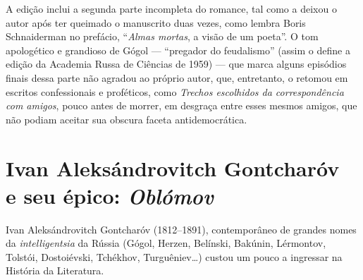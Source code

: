 A edição inclui a segunda parte incompleta do romance, tal como a deixou
o autor após ter queimado o manuscrito duas vezes, como lembra Boris Schnaiderman no prefácio, ``\emph{Almas mortas}, a visão de um poeta''. O tom apologético e grandioso de Gógol --- ``pregador do
feudalismo'' (assim o define a edição da Academia Russa de Ciências de 1959) ---
que marca alguns episódios finais dessa parte não agradou ao próprio
autor, que, entretanto, o retomou em escritos confessionais e proféticos,
como \emph{Trechos escolhidos da correspondência com amigos}, pouco antes de
morrer, em desgraça entre esses mesmos amigos, que não podiam aceitar sua
obscura faceta antidemocrática. 



\chapter{Ivan Aleksándrovitch Gontcharóv\\ e seu épico: \emph{Oblómov}}
\label{oblomov}

Ivan Aleksándrovitch Gontcharóv (1812--1891), contemporâneo de grandes
nomes da \emph{intelligentsia} da Rússia (Gógol, Herzen, Belínski, Bakúnin, Lérmontov, Tolstói, Dostoiévski, Tchékhov, Turguêniev\ldots{}) custou um pouco a ingressar na História da Literatura. 

